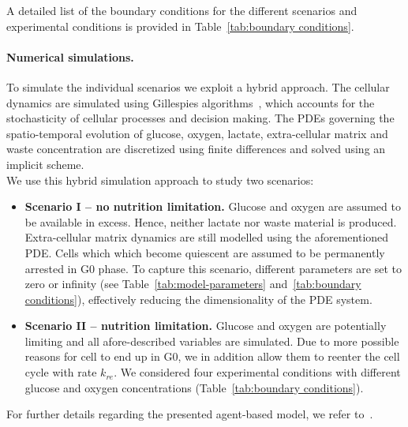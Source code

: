 \documentclass[10pt,letterpaper]{article}
\begin{document}
A detailed list of the boundary conditions for the different scenarios and experimental conditions is provided in Table~\ref{tab:boundary conditions}.

\paragraph{Numerical simulations.}
To simulate the individual scenarios we exploit a hybrid approach. The cellular dynamics are simulated using Gillespies algorithms~\cite{Gillespie1977}, which accounts for the stochasticity of cellular processes and decision making. The PDEs governing the spatio-temporal evolution of glucose, oxygen, lactate, extra-cellular matrix and waste concentration are discretized using finite differences and solved using an implicit scheme.
\\[1ex]
\noindent We use this hybrid simulation approach to study two scenarios:
\begin{itemize}
%
\item \textbf{Scenario I -- no nutrition limitation.} Glucose and oxygen are assumed to be available in excess. Hence, neither lactate nor waste material is produced. Extra-cellular matrix dynamics are still modelled using the aforementioned PDE. Cells which which become quiescent are assumed to be permanently arrested in G0 phase. To capture this scenario, different parameters are set to zero or infinity (see Table~\ref{tab:model-parameters} and~\ref{tab:boundary conditions}), effectively reducing the dimensionality of the PDE system.
%
\item \textbf{Scenario II -- nutrition limitation.} Glucose and oxygen are potentially limiting and all afore-described variables are simulated. Due to more possible reasons for cell to end up in G0, we in addition allow them to reenter the cell cycle with rate $k_{re}$. We considered four experimental conditions with different glucose and oxygen concentrations (Table~\ref{tab:boundary conditions}). 
\end{itemize}
For further details regarding the presented agent-based model, we refer to~\cite{Jagiella2012}.
\end{document}
